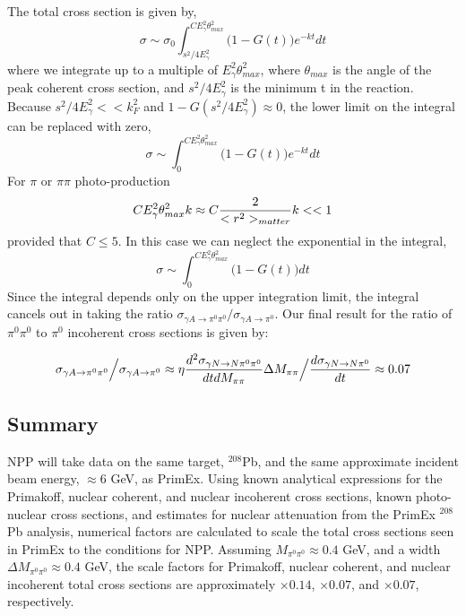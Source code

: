 The total cross section is given by, 
$$\sigma \sim \sigma_0 \int^{C E^2_\gamma \theta^2_{max}}_{s^2/4E^2_\gamma} \Big( 1 - G(t) \Big) e^{-kt} dt  $$
where we integrate up to a multiple of $E_\gamma^2 \theta_{max}^2$, where $\theta_{max}$  is the angle of the peak coherent cross section, and $s^2/4E^2_\gamma$ is the minimum t in the reaction.  
Because $s^2/4E^2_\gamma << k^2_F$ and $1-G(s^2/4E^2_\gamma) \approx 0$, the lower limit on the integral can be replaced with zero, 
$$\sigma \sim \int^{CE^2_\gamma \theta^2_{max}}_0 \Big( 1 - G(t) \Big) e^{-kt}  dt $$
For $\pi$ or $\pi \pi$ photo-production 
$$ C  E^2_\gamma \theta^2_{max} k \approx C  { 2 \over <r^2>_{matter} } k << 1 $$
provided that $C \le 5$. In this case we can neglect the exponential in the integral, 
$$\sigma \sim \int^{C E^2_\gamma \theta^2_{max}}_0 \Big( 1 - G(t) \Big) dt $$
Since the integral depends only on the upper integration limit,   the integral  cancels out in taking the ratio $ \sigma_{\gamma A \rightarrow  \pi^0 \pi^0}  \Big/ \sigma_{\gamma A \rightarrow  \pi^0} $. 
Our final result for the ratio of  $\pi^0 \pi^0$ to $\pi^0$ incoherent cross sections is given by: 

$$  \sigma_{\gamma A \rightarrow  \pi^0 \pi^0}  \Big/ \sigma_{\gamma A \rightarrow  \pi^0}  \approx \eta 
 {d^2\sigma_{\gamma N \rightarrow N \pi^0 \pi^0} \over dt dM_{\pi \pi} }  \Delta M_{\pi \pi}\Big/ { d\sigma_{\gamma N \rightarrow N \pi^0} \over dt} \approx 0.07 $$

\subsection{Summary}
NPP will take data on the same target, $^{208}$Pb, and the same approximate incident beam energy, $\approx 6$ GeV, as PrimEx. Using known analytical expressions for the Primakoff, nuclear coherent, and nuclear incoherent cross sections, known photo-nuclear cross sections, and estimates for nuclear attenuation from the PrimEx $^{208}$Pb analysis, numerical factors are calculated to scale the total cross sections seen in PrimEx to the 
conditions for NPP.  Assuming $M_{\pi^0 \pi^0} \approx 0.4$ GeV, and a width  $\Delta M_{\pi^0 \pi^0} \approx 0.4$ GeV, the scale factors for Primakoff, nuclear coherent, and nuclear incoherent total cross sections are approximately $\times 0.14$, $\times 0.07$, and $\times 0.07$, respectively. 

